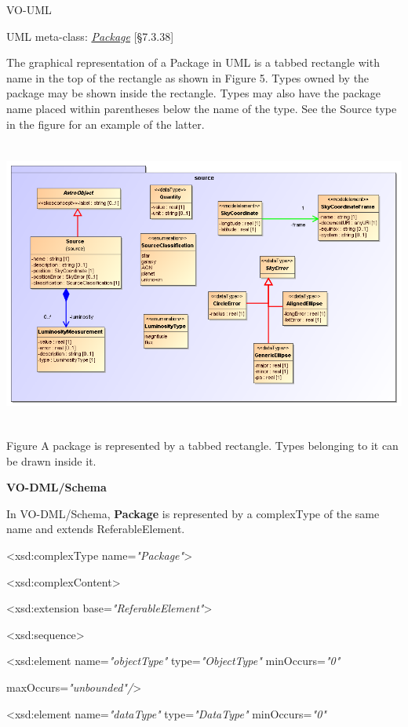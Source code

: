 \documentclass[10pt,a4paper]{ivoa}
\begin{document}
VO-UML

UML meta-class:
\href{http://www.uml-diagrams.org/package-diagrams.html\#package}{\emph{Package}}
{[}§7.3.38{]}

The graphical representation of a Package in UML is a tabbed rectangle
with name in the top of the rectangle as shown in Figure 5. Types owned
by the package may be shown inside the rectangle. Types may also have
the package name placed within parentheses below the name of the type.
See the Source type in the figure for an example of the latter.

\includegraphics[width=6in,height=3.72222in]{./media/image8.png}

Figure A package is represented by a tabbed rectangle. Types belonging
to it can be drawn inside it.

\textbf{VO-DML/Schema}

In VO-DML/Schema, \textbf{Package} is represented by a complexType of
the same name and extends ReferableElement.

\textless xsd:complexType name=\emph{"Package"}\textgreater{}

\textless xsd:complexContent\textgreater{}

\textless xsd:extension base=\emph{"ReferableElement"}\textgreater{}

\textless xsd:sequence\textgreater{}

\textless xsd:element name=\emph{"objectType"} type=\emph{"ObjectType"}
minOccurs=\emph{"0"}

maxOccurs=\emph{"unbounded"/}\textgreater{}

\textless xsd:element name=\emph{"dataType"} type=\emph{"DataType"}
minOccurs=\emph{"0"}
\end{document}
